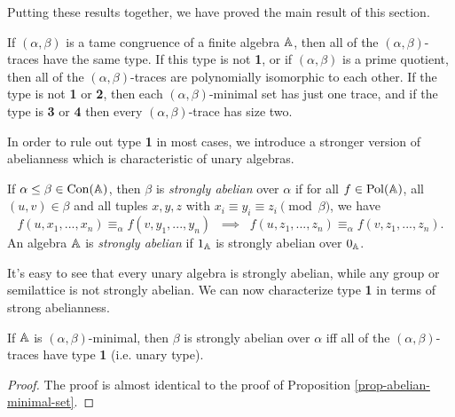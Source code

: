 \begin{appendices}
Putting these results together, we have proved the main result of this section.

\begin{thm}\label{thm-same-type} If $(\alpha,\beta)$ is a tame congruence of a finite algebra $\mathbb{A}$, then all of the $(\alpha,\beta)$-traces have the same type. If this type is not \textbf{1}, or if $(\alpha,\beta)$ is a prime quotient, then all of the $(\alpha,\beta)$-traces are polynomially isomorphic to each other. If the type is not \textbf{1} or \textbf{2}, then each $(\alpha,\beta)$-minimal set has just one trace, and if the type is \textbf{3} or \textbf{4} then every $(\alpha,\beta)$-trace has size two.
\end{thm}

In order to rule out type \textbf{1} in most cases, we introduce a stronger version of abelianness which is characteristic of unary algebras.

\begin{defn} If $\alpha \le \beta \in \operatorname{Con}(\mathbb{A})$, then $\beta$ is \emph{strongly abelian} over $\alpha$ if for all $f \in \operatorname{Pol}(\mathbb{A})$, all $(u,v) \in \beta$ and all tuples $x, y, z$ with $x_i \equiv y_i \equiv z_i \pmod{\beta}$, we have
\[
f(u,x_1, ..., x_n) \equiv_\alpha f(v, y_1, ..., y_n) \;\; \implies \;\; f(u, z_1, ..., z_n) \equiv_\alpha f(v, z_1, ..., z_n).
\]
An algebra $\mathbb{A}$ is \emph{strongly abelian} if $1_{\mathbb{A}}$ is strongly abelian over $0_{\mathbb{A}}$.
\end{defn}

It's easy to see that every unary algebra is strongly abelian, while any group or semilattice is not strongly abelian. We can now characterize type \textbf{1} in terms of strong abelianness.

\begin{prop}\label{prop-strong-abelian-minimal-set} If $\mathbb{A}$ is $(\alpha,\beta)$-minimal, then $\beta$ is strongly abelian over $\alpha$ iff all of the $(\alpha,\beta)$-traces have type \textbf{1} (i.e. unary type).
\end{prop}
\begin{proof} The proof is almost identical to the proof of Proposition \ref{prop-abelian-minimal-set}.
\end{proof}


\end{appendices}
